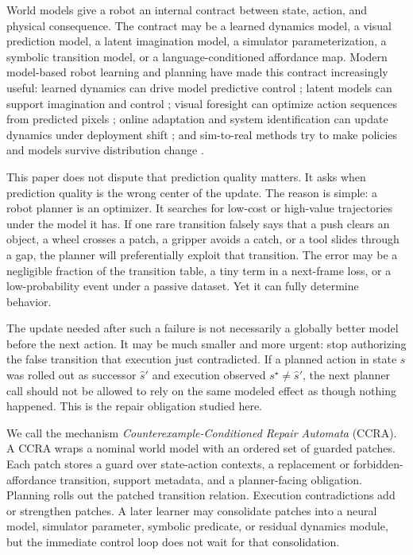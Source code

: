 \documentclass{article}
\begin{document}
World models give a robot an internal contract between state, action, and physical consequence. The contract may be a learned dynamics model, a visual prediction model, a latent imagination model, a simulator parameterization, a symbolic transition model, or a language-conditioned affordance map. Modern model-based robot learning and planning have made this contract increasingly useful: learned dynamics can drive model predictive control \citep{lenz2015deepmpc,nagabandi2018neural,chua2018pets}; latent models can support imagination and control \citep{ha2018worldmodels,hafner2019planet,hafner2020dreamer}; visual foresight can optimize action sequences from predicted pixels \citep{ebert2018visual}; online adaptation and system identification can update dynamics under deployment shift \citep{fu2016oneshot,yu2017uposi}; and sim-to-real methods try to make policies and models survive distribution change \citep{tobin2017domain,tan2018sim,jeong2020self}.

This paper does not dispute that prediction quality matters. It asks when prediction quality is the wrong center of the update. The reason is simple: a robot planner is an optimizer. It searches for low-cost or high-value trajectories under the model it has. If one rare transition falsely says that a push clears an object, a wheel crosses a patch, a gripper avoids a catch, or a tool slides through a gap, the planner will preferentially exploit that transition. The error may be a negligible fraction of the transition table, a tiny term in a next-frame loss, or a low-probability event under a passive dataset. Yet it can fully determine behavior.

The update needed after such a failure is not necessarily a globally better model before the next action. It may be much smaller and more urgent: stop authorizing the false transition that execution just contradicted. If a planned action in state $s$ was rolled out as successor $\hat{s}'$ and execution observed $s^\star\neq \hat{s}'$, the next planner call should not be allowed to rely on the same modeled effect as though nothing happened. This is the repair obligation studied here.

We call the mechanism \emph{Counterexample-Conditioned Repair Automata} (CCRA). A CCRA wraps a nominal world model with an ordered set of guarded patches. Each patch stores a guard over state-action contexts, a replacement or forbidden-affordance transition, support metadata, and a planner-facing obligation. Planning rolls out the patched transition relation. Execution contradictions add or strengthen patches. A later learner may consolidate patches into a neural model, simulator parameter, symbolic predicate, or residual dynamics module, but the immediate control loop does not wait for that consolidation.
\end{document}
